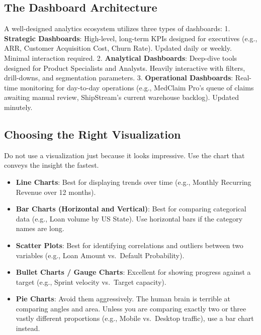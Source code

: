 \documentclass[
  11pt,
  openany,
  oneside]{book}
\providecommand{\tightlist}{%
  \setlength{\itemsep}{0pt}\setlength{\parskip}{0pt}}
\begin{document}
\subsection{The Dashboard
Architecture}\label{the-dashboard-architecture}

A well-designed analytics ecosystem utilizes three types of dashboards:
1. \textbf{Strategic Dashboards}: High-level, long-term KPIs designed
for executives (e.g., ARR, Customer Acquisition Cost, Churn Rate).
Updated daily or weekly. Minimal interaction required. 2.
\textbf{Analytical Dashboards}: Deep-dive tools designed for Product
Specialists and Analysts. Heavily interactive with filters, drill-downs,
and segmentation parameters. 3. \textbf{Operational Dashboards}:
Real-time monitoring for day-to-day operations (e.g., MedClaim Pro's
queue of claims awaiting manual review, ShipStream's current warehouse
backlog). Updated minutely.

\subsection{Choosing the Right
Visualization}\label{choosing-the-right-visualization}

Do not use a visualization just because it looks impressive. Use the
chart that conveys the insight the fastest.

\begin{itemize}
\tightlist
\item
  \textbf{Line Charts}: Best for displaying trends over time (e.g.,
  Monthly Recurring Revenue over 12 months).
\item
  \textbf{Bar Charts (Horizontal and Vertical)}: Best for comparing
  categorical data (e.g., Loan volume by US State). Use horizontal bars
  if the category names are long.
\item
  \textbf{Scatter Plots}: Best for identifying correlations and outliers
  between two variables (e.g., Loan Amount vs.~Default Probability).
\item
  \textbf{Bullet Charts / Gauge Charts}: Excellent for showing progress
  against a target (e.g., Sprint velocity vs.~Target capacity).
\item
  \textbf{Pie Charts}: Avoid them aggressively. The human brain is
  terrible at comparing angles and area. Unless you are comparing
  exactly two or three vastly different proportions (e.g., Mobile
  vs.~Desktop traffic), use a bar chart instead.
\end{itemize}
\end{document}
